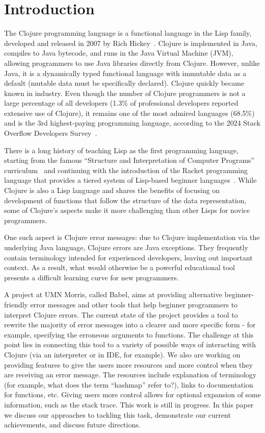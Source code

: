 \documentclass[12pt]{article}
\newcommand{\comment}[1]{}
\newcommand{\emcomment}[1]{\textcolor{ForestGreen}{\comment{Elena: {#1}}}}
\begin{document}
\newpage
\setcounter{page}{1}

\section{Introduction}
The Clojure programming language is a functional language in the Lisp family, developed and released in 2007 
by Rich Hickey~\cite{Hickey:2008}. 
Clojure is implemented in Java, compiles to Java bytecode, and runs in the Java Virtual Machine (JVM), 
allowing programmers to use Java libraries directly from Clojure. 
However, unlike Java, it is a dynamically typed functional language with immutable data as a default (mutable data 
must be specifically declared).
Clojure quickly became known in industry. Even though the number of Clojure programmers is not a large percentage
of all developers (1.3\% of professional developers reported extensive use of Clojure), it remains one of the most admired languages (68.5\%) and is the 3rd highest-paying programming language, according to the 2024 Stack Overflow Developers Survey~\cite{survey}.

There is a long history of teaching Lisp as the first programming language, starting from the famous  ``Structure and Interpretation of Computer Programs'' curriculum~\cite{Abelson} and continuing with the introduction of the 
Racket programming language that provides a tiered system of Lisp-based beginner languages~\cite{Felleisen:2004,racket}. While Clojure is also a Lisp language and shares the benefits of focusing on development of functions that follow the structure of the data representation, some of Clojure's aspects make it more challenging than other Lisps for novice programmers. 

One such aspect is Clojure error messages: due to Clojure implementation via the underlying Java language, 
Clojure errors are Java exceptions. 
They frequently contain terminology intended for experienced developers, leaving out important context. 
As a result, what would otherwise be a powerful educational tool presents a difficult learning curve for new programmers.

A project at UMN Morris, called Babel, aims at providing alternative beginner-friendly error messages and other tools that help beginner programmers to interpret Clojure errors. 
The current state of the project provides a tool to rewrite the majority of error messages into a clearer and more specific form - for example, specifying the erroneous arguments to functions. 
The challenge at this point lies in connecting this tool to a variety of possible ways of interacting with Clojure (via an interpreter or in IDE, for example). 
We also are working on providing features to give the users more resources and more control when they are receiving an error message. The resources include explanation of terminology (for example, what does the term ``hashmap'' refer to?), links to documentation for functions, etc. Giving users more control allows for optional expansion of some information, such as the stack trace. 
This work is still in progress. 
In this paper we discuss our approaches to tackling this task, demonstrate our current achievements, and discuss future directions. 
\end{document}

